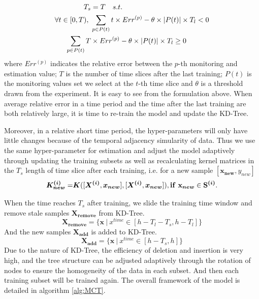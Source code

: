 \documentclass[twoside,leqno,twocolumn]{article}
\begin{document}
\begin{align}
    T_s &= T \notag  \quad  s.t. \notag \\
    \forall t \in [0, T), ~& \sum_{p\in P(t)}t \times Err^{(p)} - \theta \times |P(t)| \times T_l < 0 \label{Eq:Ts_set}\\
     \sum_{p\in P(t)}T & \times Err^{(p)} - \theta \times |P(t)| \times T_l \geq 0 \notag
\end{align}
where $Err^{(p)}$ indicates the relative error between the $p$-th monitoring  and estimation value; $T$ is the number of time slices after the last training; $P(t)$ is the monitoring values set we select at the $t$-th time slice and $\theta$ is a threshold drawn from the experiment. It is easy to see from the formulation above. When average relative error in a time period and the time after the last training are both relatively large, it is time to re-train the model and update the KD-Tree.

Moreover, in a relative short time period, the hyper-parameters will only have little changes because of the temporal adjacency simularity of data. Thus we use the same hyper-parameter for estimation and adjust the model adaptively through updating the training subsets as well as recalculating kernel matrices in the $T_s$ length of time slice after each training, i.e. for a  new  sample $[\bm{x_{new}}, y_{new}]$
\begin{equation}
	\begin{split}
	\bm{K^{(i)}_{new}} = &\bm{K}([\bm{X^{(i)}}, \bm{x_{new}}], [\bm{X^{(i)}}, \bm{x_{new}}]), \bf{if} ~ \bm{x_{new}} \in \bm{S^{(i)}}. \\
	\end{split}
\end{equation}

When the time reaches $T_s$ after training, we slide the training time window and remove stale samples $\bm{X_{remove}}$ from KD-Tree.
\[
	{\bm{X_{remove}}} = \{\bm{x}~|~ x^{time} \in [h - T_l - T_s, h - T_l]\}
\]
And the new samples $\bm{X_{add}}$ is added to KD-Tree.
\[
	{\bm{X_{add}}} = \{\bm{x}~|~ x^{time} \in [h - T_s, h]\}
\]
Due to the nature of KD-Tree, the efficiency of deletion and insertion is very high, and the tree structure can be adjusted adaptively through the rotation of nodes to ensure the homogeneity of the data in each subset. And then each training subset will be trained again. The overall framework of the model is detailed in algorithm \ref{alg:MCT}.
\end{document}
